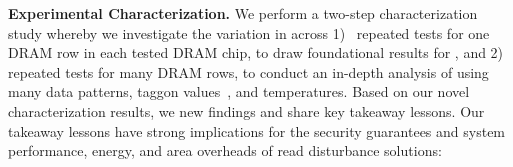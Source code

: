 



\noindent
\textbf{Experimental Characterization.} 
We perform a two-step characterization study whereby we investigate the
variation in  across 1)~ repeated tests for one
DRAM row in each tested DRAM chip, to draw foundational results for
\phenomenon{}, and 2)~ repeated tests for many DRAM rows, to
conduct an in-depth analysis of \phenomenon{} using many data patterns,
\gls{taggon} values~\cite{luo2023rowpress}, and temperatures. Based on our novel
characterization results, we   new findings and
share  key takeaway lessons. Our takeaway lessons have
strong implications for the security guarantees and system performance, energy,
and area overheads of read disturbance solutions: 

